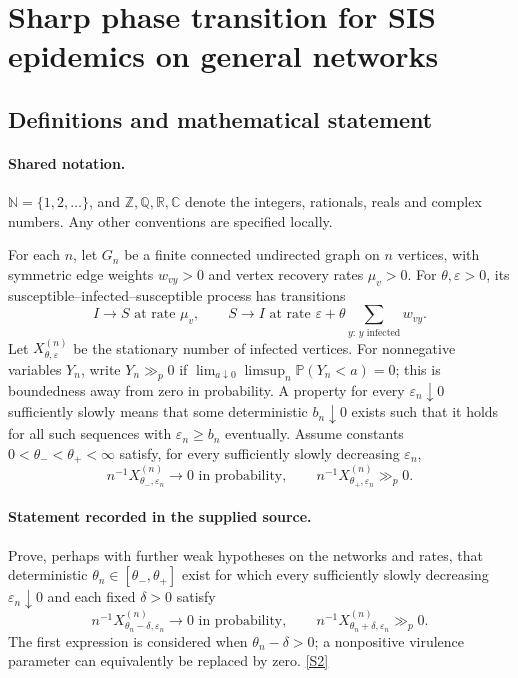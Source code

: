 \documentclass[11pt]{article}
\newcommand{\sref}[2]{\hyperlink{source:#1:#2}{[S#2]}}
\begin{document}
\section{Sharp phase transition for SIS epidemics on general networks}\label{statement}

\subsection{Definitions and mathematical statement}

\paragraph{Shared notation.}$\mathbb N=\{1,2,\ldots\}$, and $\mathbb Z,\mathbb Q,\mathbb R,\mathbb C$ denote the integers, rationals, reals and complex numbers. Any other conventions are specified locally.


For each $n$, let $G_n$ be a finite connected undirected graph on $n$ vertices, with symmetric edge weights $w_{vy}>0$ and vertex recovery rates $\mu_v>0$. For $\theta,\varepsilon>0$, its susceptible--infected--susceptible process has transitions
\[I\to S\text{ at rate }\mu_v,\qquad S\to I\text{ at rate }\varepsilon+\theta\sum_{y:\,y\text{ infected}}w_{vy}.\]
Let $X^{(n)}_{\theta,\varepsilon}$ be the stationary number of infected vertices. For nonnegative variables $Y_n$, write $Y_n\gg_p0$ if $\lim_{a\downarrow0}\limsup_n\mathbb P(Y_n<a)=0$; this is boundedness away from zero in probability. A property for every $\varepsilon_n\downarrow0$ sufficiently slowly means that some deterministic $b_n\downarrow0$ exists such that it holds for all such sequences with $\varepsilon_n\ge b_n$ eventually.
Assume constants $0<\theta_-<\theta_+<\infty$ satisfy, for every sufficiently slowly decreasing $\varepsilon_n$,
\[n^{-1}X^{(n)}_{\theta_-,\varepsilon_n}\to0\text{ in probability},\qquad n^{-1}X^{(n)}_{\theta_+,\varepsilon_n}\gg_p0.\]
\paragraph{Statement recorded in the supplied source.}
Prove, perhaps with further weak hypotheses on the networks and rates, that deterministic $\theta_n\in[\theta_-,\theta_+]$ exist for which every sufficiently slowly decreasing $\varepsilon_n\downarrow0$ and each fixed $\delta>0$ satisfy
\[n^{-1}X^{(n)}_{\theta_n-\delta,\varepsilon_n}\to0\text{ in probability},\qquad n^{-1}X^{(n)}_{\theta_n+\delta,\varepsilon_n}\gg_p0.\]
The first expression is considered when $\theta_n-\delta>0$; a nonpositive virulence parameter can equivalently be replaced by zero. \sref{statement}{2}
\end{document}
